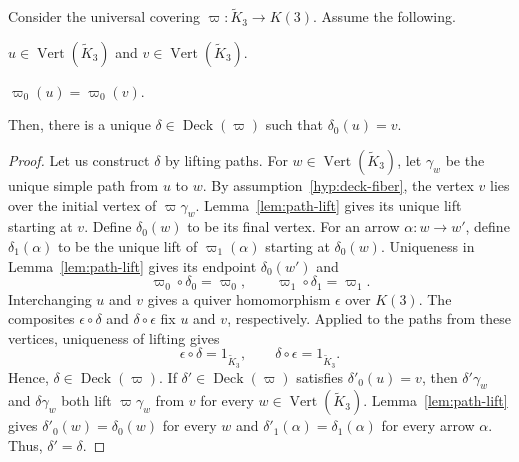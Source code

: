 \begin{lemma}\label{lem:cover-deck-transitivity}
Consider the universal covering $\varpi:\widetilde K_3\to K(3)$.
Assume the following.
\begin{hypotheses}
\item\label{hyp:deck-vertices} $u\in\operatorname{Vert}(\widetilde K_3)$ and $v\in\operatorname{Vert}(\widetilde K_3)$.
\item\label{hyp:deck-fiber} $\varpi_0(u)=\varpi_0(v)$.
\end{hypotheses}
Then, there is a unique $\delta\in\operatorname{Deck}(\varpi)$ such that $\delta_0(u)=v$.
\end{lemma}
\begin{proof}
Let us construct $\delta$ by lifting paths.
For $w\in\operatorname{Vert}(\widetilde K_3)$, let $\gamma_w$ be the unique simple path from $u$ to $w$.
By assumption~\ref{hyp:deck-fiber}, the vertex $v$ lies over the initial vertex of $\varpi\gamma_w$. Lemma~\ref{lem:path-lift} gives its unique lift starting at $v$.
Define $\delta_0(w)$ to be its final vertex.
For an arrow $\alpha:w\to w'$, define $\delta_1(\alpha)$ to be the unique lift of $\varpi_1(\alpha)$ starting at $\delta_0(w)$.
Uniqueness in Lemma~\ref{lem:path-lift} gives its endpoint $\delta_0(w')$ and
\[
 \varpi_0\circ\delta_0=\varpi_0,\qquad
 \varpi_1\circ\delta_1=\varpi_1.
\]
Interchanging $u$ and $v$ gives a quiver homomorphism $\epsilon$ over $K(3)$.
The composites $\epsilon\circ\delta$ and $\delta\circ\epsilon$ fix $u$ and $v$, respectively.
Applied to the paths from these vertices, uniqueness of lifting gives
\[
 \epsilon\circ\delta=1_{\widetilde K_3},\qquad
 \delta\circ\epsilon=1_{\widetilde K_3}.
\]
Hence, $\delta\in\operatorname{Deck}(\varpi)$.
If $\delta'\in\operatorname{Deck}(\varpi)$ satisfies $\delta'_0(u)=v$, then $\delta'\gamma_w$ and $\delta\gamma_w$ both lift $\varpi\gamma_w$ from $v$ for every $w\in\operatorname{Vert}(\widetilde K_3)$.
Lemma~\ref{lem:path-lift} gives $\delta'_0(w)=\delta_0(w)$ for every $w$ and $\delta'_1(\alpha)=\delta_1(\alpha)$ for every arrow $\alpha$.
Thus, $\delta'=\delta$.
\end{proof}

